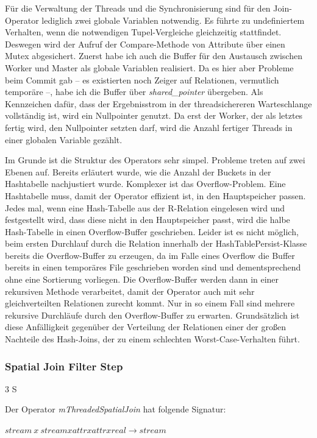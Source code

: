 \documentclass[a4paper,12pt,twoside]{article}
\newcommand{\Fb}[1]{\textit{#1}} %
\begin{document}
Für die Verwaltung der Threads und die Synchronisierung sind für den Join-Operator lediglich zwei globale Variablen notwendig. Es führte zu undefiniertem Verhalten, wenn die notwendigen Tupel-Vergleiche gleichzeitig stattfindet. Deswegen wird der Aufruf der Compare-Methode von Attribute über einen Mutex abgesichert. Zuerst habe ich auch die Buffer für den Austausch zwischen Worker und Master als globale Variablen realisiert. Da es hier aber Probleme beim Commit gab -- es existierten noch Zeiger auf Relationen, vermutlich temporäre --, habe ich die Buffer über \Fb{shared\_pointer} übergeben. Als Kennzeichen dafür, dass der Ergebnisstrom in der threadsichereren Warteschlange vollständig ist, wird ein Nullpointer genutzt. Da erst der Worker, der als letztes fertig wird, den Nullpointer setzten darf, wird die Anzahl fertiger Threads in einer globalen Variable gezählt.
 
Im Grunde ist die Struktur des Operators sehr simpel. Probleme treten auf zwei Ebenen auf. Bereits erläutert wurde, wie die Anzahl der Buckets in der Hashtabelle nachjustiert wurde. Komplexer ist das Overflow-Problem. Eine Hashtabelle muss, damit der Operator effizient ist, in den Hauptspeicher passen. Jedes mal, wenn eine Hash-Tabelle aus der R-Relation eingelesen wird und festgestellt wird, dass diese nicht in den Hauptspeicher passt, wird die halbe Hash-Tabelle in einen Overflow-Buffer geschrieben. Leider ist es nicht möglich, beim ersten Durchlauf durch die Relation innerhalb der HashTablePersist-Klasse bereits die Overflow-Buffer zu erzeugen, da im Falle eines Overflow die Buffer bereits in einen temporäres File geschrieben worden sind und dementsprechend ohne eine Sortierung vorliegen. Die Overflow-Buffer werden dann in einer rekursiven Methode verarbeitet, damit der Operator auch mit sehr gleichverteilten Relationen zurecht kommt. Nur in so einem Fall sind mehrere rekursive Durchläufe durch den Overflow-Buffer zu erwarten. Grundsätzlich ist diese Anfälligkeit gegenüber der Verteilung der Relationen einer der großen Nachteile des Hash-Joins, der zu einem schlechten Worst-Case-Verhalten führt.

\subsubsection{Spatial Join Filter Step} 3 S

Der Operator \Fb{mThreadedSpatialJoin} hat folgende Signatur:

$stream~x~stream x attr x attr x real \longrightarrow stream$
\end{document}

